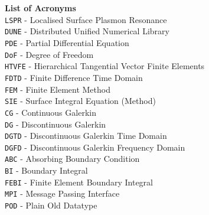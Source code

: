 \documentclass[a4paper,11pt]{article}
\begin{document}
\noindent
\textbf{List of Acronyms} \\
\texttt{LSPR} - Localised Surface Plasmon Resonance\\
%
%
\texttt{DUNE} - Distributed Unified Numerical Library\\
\texttt{PDE} - Partial Differential Equation\\
\texttt{DoF} - Degree of Freedom\\
\texttt{HTVFE} - Hierarchical Tangential Vector Finite Elements\\
\texttt{FDTD} - Finite Difference Time Domain \\
\texttt{FEM} - Finite Element Method\\
\texttt{SIE} - Surface Integral Equation (Method)\\
\texttt{CG} - Continuous Galerkin\\
\texttt{DG} - Discontinuous Galerkin\\
\texttt{DGTD} - Discontinuous Galerkin Time Domain\\
\texttt{DGFD} - Discontinuous Galerkin Frequency Domain\\
\texttt{ABC} - Absorbing Boundary Condition\\
\texttt{BI} - Boundary Integral \\
\texttt{FEBI} - Finite Element Boundary Integral\\
%
%
\texttt{MPI} - Message Passing Interface\\
\texttt{POD} - Plain Old Datatype\\
\end{document}

